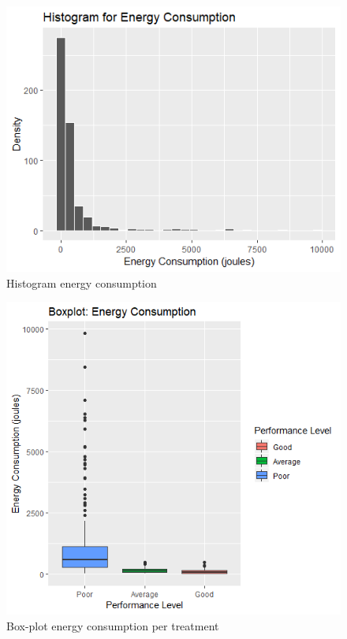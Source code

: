 \begin{figure}[H]
  \includegraphics[width=\linewidth]{./NewImages/Fig_4_Histogram_Energy_Consumption.png}
  \caption{Histogram energy consumption}
  \label{fig:histec}
\end{figure}



\begin{figure}[H]
  \includegraphics[width=\linewidth]{./NewImages/Fig_5_Box_Plot_Energy_Per_Level.png}
  \caption{Box-plot energy consumption per treatment}
  \label{fig:boxecv}
\end{figure}

